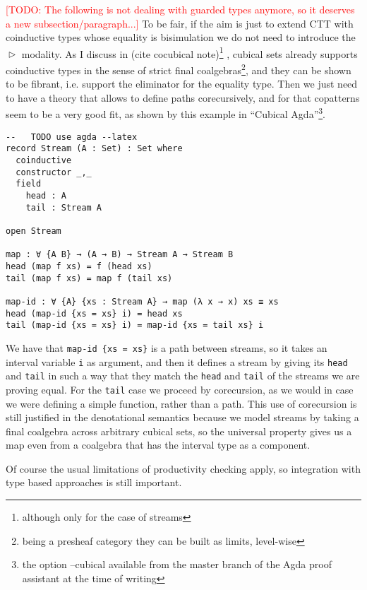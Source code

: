 \documentclass{book}
\newcommand{\TODO}[1]{\textcolor{red}{[TODO: #1]}}
\DeclareMathOperator{\Later}{\vartriangleright}
\begin{document}
  \TODO{The following is not dealing with guarded types anymore, so it
    deserves a new subsection/paragraph...}
  To be fair, if the aim is just to extend CTT with coinductive types
  whose equality is bisimulation we do not need to introduce the
  $\Later$ modality. As I discuss in (cite cocubical
  note)\footnote{although only for the case of streams} , cubical sets
  already supports coinductive types in the sense of strict final
  coalgebras\footnote{being a presheaf category they can be built as
    limits, level-wise}, and they can be shown to be fibrant,
  i.e. support the eliminator for the equality type.  Then we just
  need to have a theory that allows to define paths corecursively, and
  for that copatterns seem to be a very good fit, as shown by this
  example in ``Cubical Agda''\footnote{the option --cubical available from the master branch of the Agda proof assistant at the time of writing}.
\begin{verbatim}
--   TODO use agda --latex
record Stream (A : Set) : Set where
  coinductive
  constructor _,_
  field
    head : A
    tail : Stream A

open Stream

map : ∀ {A B} → (A → B) → Stream A → Stream B
head (map f xs) = f (head xs)
tail (map f xs) = map f (tail xs)

map-id : ∀ {A} {xs : Stream A} → map (λ x → x) xs ≡ xs
head (map-id {xs = xs} i) = head xs
tail (map-id {xs = xs} i) = map-id {xs = tail xs} i
\end{verbatim}
  We have that \verb|map-id {xs = xs}| is a path between streams, so it
  takes an interval variable \verb|i| as argument, and then it defines a
  stream by giving its \verb|head| and \verb|tail| in such a way that they match
  the \verb|head| and \verb|tail| of the streams we are proving equal.  For the
  \verb|tail| case we proceed by corecursion, as we would in case we were
  defining a simple function, rather than a path.  This use of
  corecursion is still justified in the denotational semantics because
  we model streams by taking a final coalgebra across arbitrary
  cubical sets, so the universal property gives us a map even from a coalgebra that
  has the interval type as a component.

  Of course the usual limitations of productivity checking apply, so
  integration with type based approaches is still important.

\end{document}
